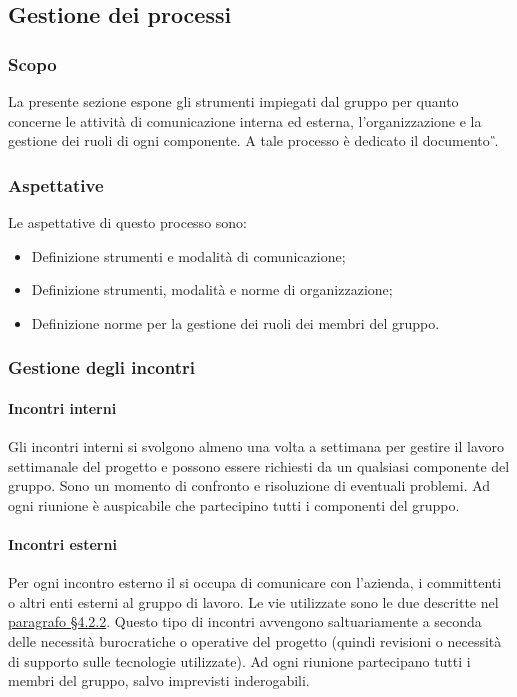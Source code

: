 \subsection{Gestione dei processi} %
\subsubsection{Scopo}
La presente sezione espone gli strumenti impiegati dal gruppo \teamname{} per quanto concerne le attività di comunicazione interna ed esterna, l'organizzazione e la gestione dei ruoli di ogni componente.
A tale processo è dedicato il documento \PdP{}\textit{\G}.

\subsubsection{Aspettative}
Le aspettative di questo processo sono:
\begin{itemize}
	\item Definizione strumenti e modalità di comunicazione;
	\item Definizione strumenti, modalità e norme di organizzazione;
	\item Definizione norme per la gestione dei ruoli dei membri del gruppo.
\end{itemize}


		
\subsubsection{Gestione degli incontri}
	\paragraph{Incontri interni}
	Gli incontri interni si svolgono almeno una volta a settimana per gestire il lavoro settimanale del progetto e possono essere richiesti da un qualsiasi componente del gruppo. Sono un momento di confronto e risoluzione di eventuali problemi. Ad ogni riunione è auspicabile che partecipino tutti i componenti del gruppo.
	\paragraph{Incontri esterni}
	Per ogni incontro esterno il \RdP{} si occupa di comunicare con l'azienda, i committenti o altri enti esterni al gruppo di lavoro. 
	Le vie utilizzate sono le due descritte nel \hyperref[sec:Comunicazioni esterne]{paragrafo \S4.2.2}.
	Questo tipo di incontri avvengono saltuariamente a seconda delle necessità burocratiche o operative del progetto (quindi revisioni o necessità di supporto sulle tecnologie utilizzate).
	Ad ogni riunione partecipano tutti i membri del gruppo, salvo imprevisti inderogabili.
